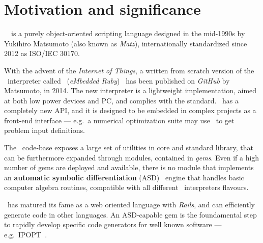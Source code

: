 
\section{Motivation and significance}
\label{sec:motivation}

\Ruby~\cite{flanagan2008ruby}~is a purely object-oriented scripting language designed in the mid-1990s by Yukihiro Matsumoto (also known as \emph{Matz}), internationally standardized since 2012 as ISO/IEC 30170.

With the advent of the \emph{Internet of Things}, a written from scratch version of the \Ruby~interpreter called \Mruby~(\emph{eMbedded Ruby})~\cite{tanaka2015mruby} has been published on \emph{GitHub} by Matsumoto, in 2014. The new interpreter is a lightweight implementation, aimed at both low power devices and PC, and complies with the standard\cite{iso30170}. \Mruby~has a completely new API, and it is designed to be embedded in complex projects as a front-end interface --- e.g.\ a numerical optimization suite may use \Mruby~to get problem input definitions.

The \Ruby~code-base exposes a large set of utilities in core and standard library, that can be furthermore expanded through modules, contained in \emph{gems}. Even if a high number of gems are deployed and available, there is no module that implements an \textbf{automatic symbolic differentiation} (ASD)~\cite{tolsma1998computational} engine that handles basic computer algebra routines, compatible with all different \Ruby~interpreters flavours.

\Ruby~has matured its fame as a web oriented language with \emph{Rails}, and can efficiently generate code in other languages. An ASD-capable gem is the foundamental step to rapidly develop specific code generators for well known software --- e.g.\ IPOPT~\cite{wachter2009ipopt}\@.

